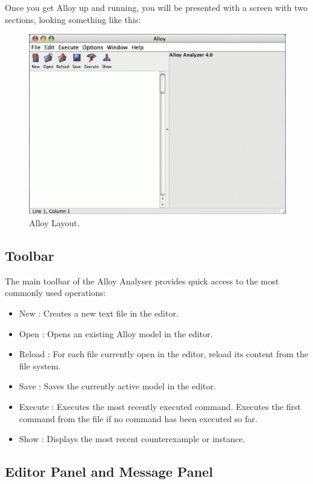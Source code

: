 \documentclass[a4paper,12pt]{report}
\begin{document}
Once you get Alloy up and running, you will be presented with a screen with two sections, looking something like this:

 \begin{figure}[ht!]
\centering
 \includegraphics[width= 1.0\textwidth]{alloyblank}
\caption{Alloy Layout.}
 \end{figure}
 
\subsection{Toolbar}
\label{Tools}

The main toolbar of the Alloy Analyser provides quick access to the most commonly used operations:
\begin{itemize}
\item New : Creates a new text file in the editor.
\item Open : Opens an existing Alloy model in the editor.
\item Reload : For each file currently open in the editor, reload its content from the file system.
\item Save : Saves the currently active model in the editor.
\item Execute : Executes the most recently executed command. Executes the first command from the file if no command has been executed so far.
\item Show : Displays the most recent counterexample or instance.
\end{itemize}

\subsection{Editor Panel and Message Panel}
\label{Editor and Message Panel}
\end{document}
